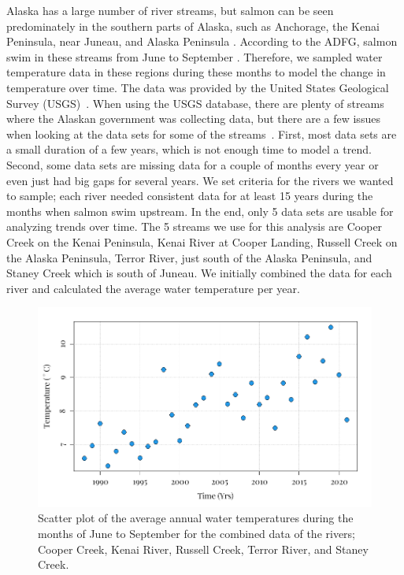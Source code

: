 Alaska has a large number of river streams, but salmon can be seen predominately in the southern parts of Alaska, such as Anchorage, the Kenai Peninsula, near Juneau, and Alaska Peninsula \cite{ADFG}. 
According to the ADFG, salmon swim in these streams from June to September \cite{ADFG}.
Therefore, we sampled water temperature data in these regions during these months to model the change in temperature over time. The data was provided by the United States Geological Survey (USGS)~\cite{usgs_2022}.
When using the USGS database, there are plenty of streams where the Alaskan government was collecting data, but there are a few issues when looking at the data sets for some of the streams~\cite{usgs_2022}.
First, most data sets are a small duration of a few years, which is not enough time to model a trend.
Second, some data sets are missing data for a couple of months every year or even just had big gaps for several years. 
We set criteria for the rivers we wanted to sample; each river needed consistent data for at least 15 years during the months when salmon swim upstream.
In the end, only 5 data sets are usable for analyzing trends over time. 
The 5 streams we use for this analysis are Cooper Creek on the Kenai Peninsula, Kenai River at Cooper Landing, Russell Creek on the Alaska Peninsula, Terror River, just south of the Alaska Peninsula, and Staney Creek which is south of Juneau.
We initially combined the data for each river and calculated the average water temperature per year.
\begin{figure}[H]
    \centering
    \includegraphics[width=14cm]{Pictures/SST/Alaskan Water Temp.png}
    \caption{\singlespacing
    Scatter plot of the average annual water temperatures during the months of June to September for the combined data of the rivers; Cooper Creek, Kenai River, Russell Creek, Terror River, and Staney Creek. }
    \label{fig:alaskatemp}
\end{figure}
